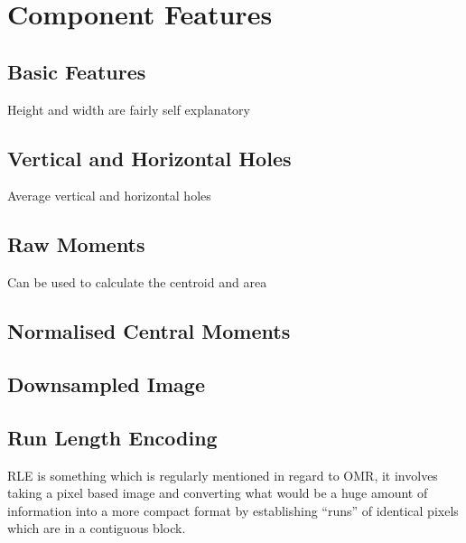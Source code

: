 \section{Component Features}

\subsection{Basic Features}

Height and width are fairly self explanatory

\subsection{Vertical and Horizontal Holes}
Average vertical and horizontal holes 

\subsection{Raw Moments}

Can be used to calculate the centroid and area


\subsection{Normalised Central Moments}

\subsection{Downsampled Image}

\subsection{Run Length Encoding}
\label{sec:tb-rle}

\acrfull{RLE} is something which is regularly mentioned in regard to OMR, it involves taking a pixel based image and converting what would be a huge amount of information into a more compact format by establishing ``runs'' of identical pixels which are in a contiguous block.

